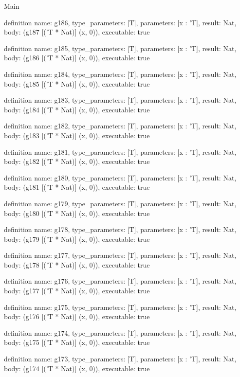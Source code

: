 \begin{lexlean}{Main}
\begin{semanticmodule}
definition{
  name: g186,
  type_parameters: [T],
  parameters: [x : 'T],
  result: Nat,
  body: (g187 [('T * Nat)] (x, 0)),
  executable: true
}

definition{
  name: g185,
  type_parameters: [T],
  parameters: [x : 'T],
  result: Nat,
  body: (g186 [('T * Nat)] (x, 0)),
  executable: true
}

definition{
  name: g184,
  type_parameters: [T],
  parameters: [x : 'T],
  result: Nat,
  body: (g185 [('T * Nat)] (x, 0)),
  executable: true
}

definition{
  name: g183,
  type_parameters: [T],
  parameters: [x : 'T],
  result: Nat,
  body: (g184 [('T * Nat)] (x, 0)),
  executable: true
}

definition{
  name: g182,
  type_parameters: [T],
  parameters: [x : 'T],
  result: Nat,
  body: (g183 [('T * Nat)] (x, 0)),
  executable: true
}

definition{
  name: g181,
  type_parameters: [T],
  parameters: [x : 'T],
  result: Nat,
  body: (g182 [('T * Nat)] (x, 0)),
  executable: true
}

definition{
  name: g180,
  type_parameters: [T],
  parameters: [x : 'T],
  result: Nat,
  body: (g181 [('T * Nat)] (x, 0)),
  executable: true
}

definition{
  name: g179,
  type_parameters: [T],
  parameters: [x : 'T],
  result: Nat,
  body: (g180 [('T * Nat)] (x, 0)),
  executable: true
}

definition{
  name: g178,
  type_parameters: [T],
  parameters: [x : 'T],
  result: Nat,
  body: (g179 [('T * Nat)] (x, 0)),
  executable: true
}

definition{
  name: g177,
  type_parameters: [T],
  parameters: [x : 'T],
  result: Nat,
  body: (g178 [('T * Nat)] (x, 0)),
  executable: true
}

definition{
  name: g176,
  type_parameters: [T],
  parameters: [x : 'T],
  result: Nat,
  body: (g177 [('T * Nat)] (x, 0)),
  executable: true
}

definition{
  name: g175,
  type_parameters: [T],
  parameters: [x : 'T],
  result: Nat,
  body: (g176 [('T * Nat)] (x, 0)),
  executable: true
}

definition{
  name: g174,
  type_parameters: [T],
  parameters: [x : 'T],
  result: Nat,
  body: (g175 [('T * Nat)] (x, 0)),
  executable: true
}

definition{
  name: g173,
  type_parameters: [T],
  parameters: [x : 'T],
  result: Nat,
  body: (g174 [('T * Nat)] (x, 0)),
  executable: true
}


\end{semanticmodule}
\end{lexlean}
